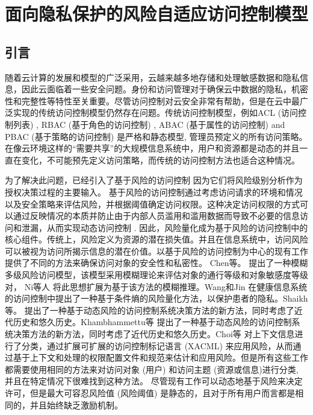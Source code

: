 \chapter{面向隐私保护的风险自适应访问控制模型}
\label{chap:RaBAC-for-privacy}

\section{引言}
\label{sec:intro}
随着云计算的发展和模型的广泛采用，云越来越多地存储和处理敏感数据和隐私信息，因此云面临着一些安全问题。身份和访问管理对于确保云中数据的隐私，机密性和完整性等特性至关重要。尽管访问控制对云安全非常有帮助，但是在云中最广泛实现的传统访问控制模型仍然存在问题。传统访问控制模型，例如ACL (访问控制列表) \cite{qian2001acla}, RBAC (基于角色的访问控制) \cite{jung2012cribac}, ABAC (基于属性的访问控制) \cite{zhang2011attribute} and PBAC (基于策略的访问控制) \cite{huang2011policy} 是严格和静态模型, 管理员预定义的所有访问策略。 在像云环境这样的“需要共享”的大规模信息系统中，用户和资源都是动态的并且一直在变化，不可能预先定义访问策略，而传统的访问控制方法也适合这种情况。

为了解决此问题，已经引入了基于风险的访问控制\cite{ni2010risk,shaikh2012dynamic,wang2011quantified,choi2015framework} 因为它们将风险级别分析作为授权决策过程的主要输入。 基于风险的访问控制通过考虑访问请求的环境和情况以及安全策略来评估风险，并根据阈值确定访问权限。这种决定访问权限的方式可以通过反映情况的本质并防止由于内部人员滥用和滥用数据而导致不必要的信息访问和泄漏，从而实现动态访问控制 \cite{chen2011risk}. 因此，风险量化成为基于风险的访问控制中的核心组件。传统上，风险定义为资源的潜在损失值。并且在信息系统中，访问风险可以被视为访问所揭示信息的潜在价值。以基于风险的访问控制为中心的现有工作提供了不同的方法来确保访问对象的安全性和私密性。 Chen等。 \cite{cheng2007fuzzy} 提出了一种模糊多级风险访问模型，该模型采用模糊理论来评估对象的通行等级和对象敏感度等级对， Ni等人\cite{ni2010risk} 将此思想扩展为基于该方法的模糊推理。Wang和Jin\cite{wang2011quantified} 在健康信息系统的访问控制中提出了一种基于条件熵的风险量化方法，以保护患者的隐私。Shaikh等。 提出了一种基于动态风险的访问控制系统决策方法的新方法，同时考虑了近代历史和悠久历史。Khambhammettu等\cite{khambhammettu2013framework} 提出了一种基于动态风险的访问控制系统决策方法的新方法，同时考虑了近代历史和悠久历史。Choi等\cite{choi2015framework} 对上下文信息进行了分类，通过扩展可扩展的访问控制标记语言 (XACML) 来应用风险，从而通过基于上下文和处理的权限配置文件和规范来估计和应用风险。但是所有这些工作都需要使用相同的方法来对访问对象 (用户) 和访问主题 (资源或信息)进行分类, 并且在特定情况下很难找到这种方法。 尽管现有工作可以动态地基于风险来决定许可，但是最大可容忍风险值 (风险阈值) 是静态的，且对于所有用户而言都是相同的，并且始终缺乏激励机制。

